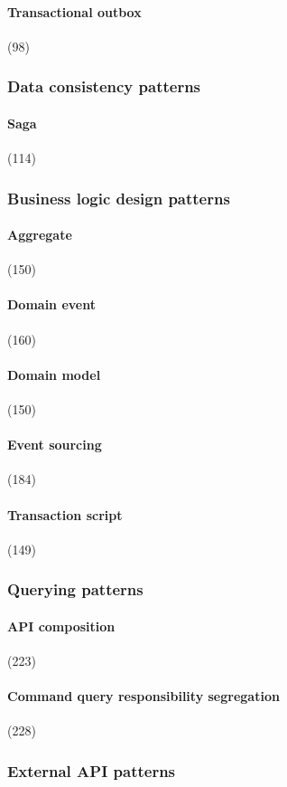 \paragraph{Transactional outbox} (98)

\subsubsection{Data consistency patterns}
\paragraph{Saga} (114)

\subsubsection{Business logic design patterns}
\paragraph{Aggregate} (150)
\paragraph{Domain event} (160)
\paragraph{Domain model} (150)
\paragraph{Event sourcing} (184)
\paragraph{Transaction script} (149)

\subsubsection{Querying patterns}
\paragraph{API composition} (223)

\paragraph{Command query responsibility segregation}
(228)

\subsubsection{External API patterns}
